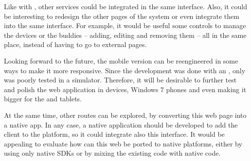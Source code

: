 Like with , other  services could be integrated in the same interface.
Also, it could be interesting to redesign the other pages of the system or even integrate them into the same interface.
For example, it would be useful some controls to manage the devices or the buddies -- adding, editing and removing them -- all in the same place, instead of having to go to external pages.

Looking forward to the future, the mobile version can be reengineered in some ways to make it more responsive.
Since the development was done with an ,  only was poorly tested in a simulator.
Therefore, it will be desirable to further test and polish the web application in  devices, Windows 7 phones and even making it bigger for the  and tablets.

At the same time, other routes can be explored, by converting this web page into a native app.
In any case, a native application should be developed to add the  client to the  platform, so it could integrate also this interface.
It would be appealing to evaluate how can this web be ported to native platforms, either by using only native SDKs or by mixing the existing code with native code.
\nicechapterending
